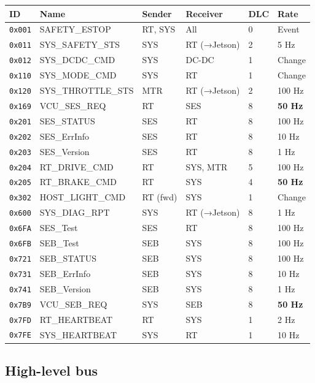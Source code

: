 \documentclass[12pt,a4paper,oneside]{report}
\begin{document}
\begin{longtable}[]{@{}llllll@{}}
\toprule\noalign{}
ID & Name & Sender & Receiver & DLC & Rate \\
\midrule\noalign{}
\endhead
\bottomrule\noalign{}
\endlastfoot
\texttt{0x001} & SAFETY\_ESTOP & RT, SYS & All & 0 & Event \\
\texttt{0x011} & SYS\_SAFETY\_STS & SYS & RT (→Jetson) & 2 & 5 Hz \\
\texttt{0x012} & SYS\_DCDC\_CMD & SYS & DC-DC & 1 & Change \\
\texttt{0x110} & SYS\_MODE\_CMD & SYS & RT & 1 & Change \\
\texttt{0x120} & SYS\_THROTTLE\_STS & MTR & RT (→Jetson) & 2 & 100 Hz \\
\texttt{0x169} & VCU\_SES\_REQ & RT & SES & 8 & \textbf{50 Hz} \\
\texttt{0x201} & SES\_STATUS & SES & RT & 8 & 100 Hz \\
\texttt{0x202} & SES\_ErrInfo & SES & RT & 8 & 10 Hz \\
\texttt{0x203} & SES\_Version & SES & RT & 8 & 1 Hz \\
\texttt{0x204} & RT\_DRIVE\_CMD & RT & SYS, MTR & 5 & 100 Hz \\
\texttt{0x205} & RT\_BRAKE\_CMD & RT & SYS & 4 & \textbf{50 Hz} \\
\texttt{0x302} & HOST\_LIGHT\_CMD & RT (fwd) & SYS & 1 & Change \\
\texttt{0x600} & SYS\_DIAG\_RPT & SYS & RT (→Jetson) & 8 & 1 Hz \\
\texttt{0x6FA} & SES\_Test & SES & RT & 8 & 100 Hz \\
\texttt{0x6FB} & SEB\_Test & SEB & SYS & 8 & 100 Hz \\
\texttt{0x721} & SEB\_STATUS & SEB & SYS & 8 & 100 Hz \\
\texttt{0x731} & SEB\_ErrInfo & SEB & SYS & 8 & 10 Hz \\
\texttt{0x741} & SEB\_Version & SEB & SYS & 8 & 1 Hz \\
\texttt{0x7B9} & VCU\_SEB\_REQ & SYS & SEB & 8 & \textbf{50 Hz} \\
\texttt{0x7FD} & RT\_HEARTBEAT & RT & SYS & 1 & 2 Hz \\
\texttt{0x7FE} & SYS\_HEARTBEAT & SYS & RT & 1 & 10 Hz \\
\end{longtable}

\subsection{High-level bus}\label{high-level-bus}
\end{document}
